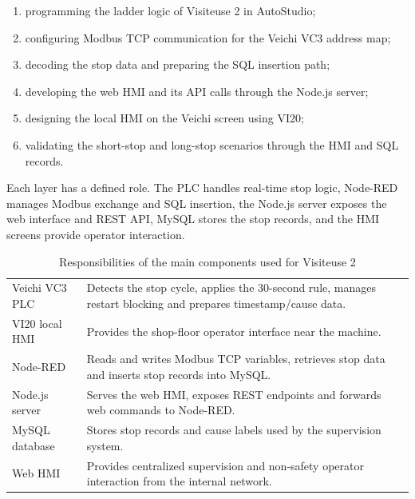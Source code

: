 \begin{enumerate}[leftmargin=1.2cm]
  \item programming the ladder logic of Visiteuse 2 in AutoStudio;
  \item configuring Modbus TCP communication for the Veichi VC3 address map;
  \item decoding the stop data and preparing the SQL insertion path;
  \item developing the web HMI and its API calls through the Node.js server;
  \item designing the local HMI on the Veichi screen using VI20;
  \item validating the short-stop and long-stop scenarios through the HMI and SQL records.
\end{enumerate}

Each layer has a defined role. The PLC handles real-time stop logic, Node-RED manages Modbus exchange and SQL insertion, the Node.js server exposes the web interface and REST API, MySQL stores the stop records, and the HMI screens provide operator interaction.

\begin{table}[H]
\centering
\caption{Responsibilities of the main components used for Visiteuse 2}
\begin{tabularx}{\textwidth}{|P{0.30\textwidth}|Y|}
\hline
{}
 &  \\
\hline
Veichi VC3 PLC & Detects the stop cycle, applies the 30-second rule, manages restart blocking and prepares timestamp/cause data. \\
\hline
VI20 local HMI & Provides the shop-floor operator interface near the machine. \\
\hline
Node-RED & Reads and writes Modbus TCP variables, retrieves stop data and inserts stop records into MySQL. \\
\hline
Node.js server & Serves the web HMI, exposes REST endpoints and forwards web commands to Node-RED. \\
\hline
MySQL database & Stores stop records and cause labels used by the supervision system. \\
\hline
Web HMI & Provides centralized supervision and non-safety operator interaction from the internal network. \\
\hline
\end{tabularx}
\end{table}

